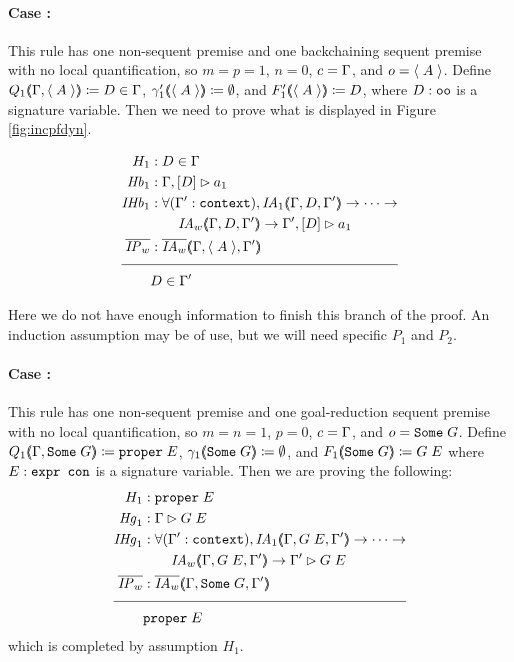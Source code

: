 \paragraph{Case \rlnmsinit{} :} This rule has one non-sequent premise and one backchaining sequent premise with no local quantification, so $m = p = 1$, $n = 0$, $c = \Gamma{}$, and $o = \langle \; A \; \rangle$. Define $Q_1 (\hspace{-0.35em} \langle \Gamma{} , \langle \; A \; \rangle \rangle \hspace{-0.35em}) \coloneqq D \in \Gamma{}$, $\gamma'_1 (\hspace{-0.35em} \langle \langle \; A \; \rangle \rangle \hspace{-0.35em}) \coloneqq \emptyset$, and $F'_1 (\hspace{-0.35em} \langle \langle \; A \; \rangle \rangle \hspace{-0.35em}) \coloneqq D$, where $D : \texttt{oo}$ is a signature variable. Then we need to prove what is displayed in Figure \ref{fig:incpfdyn}.
\begin{figure}
\begin{align*}
H_1 &: D \in \dyncon{} \\
\mathit{Hb}_1 &: \bchsl{D}{a_1} \\
\mathit{IHb}_1 &: \forall (\inddyncon{} : \sltm{context}), \mathit{IA}_1 \args{\dyncon{} , D , \inddyncon{}} \rightarrow \dots \rightarrow \\
& \qquad \mathit{IA}_w \args{\dyncon{} , D , \inddyncon{}} \rightarrow \bchsl[\inddyncon{}]{D}{a_1} \\
\ol{\mathit{IP}_w} &: \ol{\mathit{IA}_w} \args{\dyncon{} , \atom{A} , \inddyncon{}} \\[\pfshift{}]
\cline{1-2}
& D \in \inddyncon{}
\end{align*}
\end{figure}
Here we do not have enough information to finish this branch of the proof. An induction assumption may be of use, but we will need specific $P_1$ and $P_2$.

\paragraph{Case \rlnmssome{} :} This rule has one non-sequent premise and one goal-reduction sequent premise with no local quantification, so $m = n = 1$, $p = 0$, $c = \Gamma{}$, and $o = \texttt{Some} \; G$. Define $Q_1 (\hspace{-0.35em} \langle \Gamma{} , \texttt{Some} \; G \rangle \hspace{-0.35em}) \coloneqq \texttt{proper} \; E$, $\gamma_1 (\hspace{-0.35em} \langle \texttt{Some} \; G \rangle \hspace{-0.35em}) \coloneqq \emptyset$, and $F_1 (\hspace{-0.35em} \langle \texttt{Some} \; G \rangle \hspace{-0.35em}) \coloneqq G \; E$ where $E : \texttt{expr con}$ is a signature variable. Then we are proving
the following:
\begin{align*}
H_1 &: \sltm{proper} \; E \\
\mathit{Hg}_1 &: \seqsl{G \; E} \\
\mathit{IHg}_1 &: \forall (\inddyncon{} : \sltm{context}), \mathit{IA}_1 \args{\dyncon{} , G \; E , \inddyncon{}} \rightarrow \dots \rightarrow \\
& \qquad \mathit{IA}_w \args{\dyncon{} , G \; E , \inddyncon{}} \rightarrow \seqsl[\inddyncon{}]{G \; E} \\
\ol{\mathit{IP}_w} &: \ol{\mathit{IA}_w} \args{\dyncon{} , \sltm{Some} \; G , \inddyncon{}} \\[\pfshift{}]
\cline{1-2}
& \sltm{proper} \; E
\end{align*}
which is completed by assumption $H_1$.

